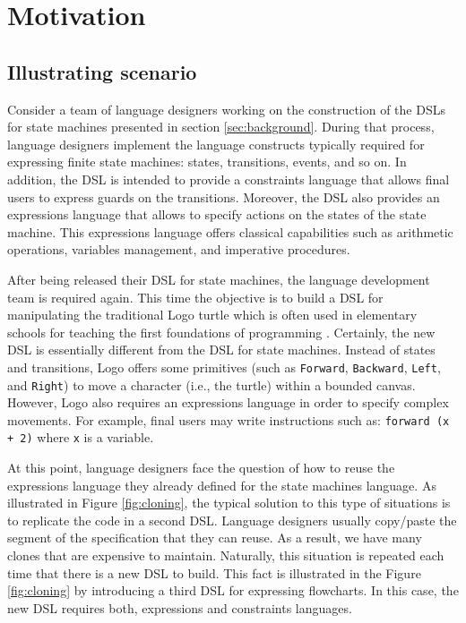 \section{Motivation}
\label{sec:motivation}

\subsection{Illustrating scenario}

Consider a team of language designers working on the construction of the DSLs for state machines presented in section \ref{sec:background}. During that process, language designers implement the language constructs typically required for expressing finite state machines: states, transitions, events, and so on. In addition, the DSL is intended to provide a constraints language that allows final users to express guards on the transitions. Moreover, the DSL also provides an expressions language that allows to specify actions on the states of the state machine. This expressions language offers classical capabilities such as arithmetic operations, variables management, and imperative procedures. 

After being released their DSL for state machines, the language development team is required again. This time the objective is to build a DSL for manipulating the traditional Logo turtle which is often used in elementary schools for teaching the first foundations of programming \cite{Olson:1987}. Certainly, the new DSL is essentially different from the DSL for state machines. Instead of states and transitions, Logo offers some primitives (such as \texttt{Forward}, \texttt{Backward}, \texttt{Left}, and \texttt{Right}) to move a character (i.e., the turtle) within a bounded canvas. However, Logo also requires an expressions language in order to specify complex movements. For example, final users may write instructions such as: \texttt{forward (x + 2)} where \texttt{x} is a variable.

At this point, language designers face the question of how to reuse the expressions language they already defined for the state machines language. As illustrated in Figure \ref{fig:cloning}, the typical solution to this type of situations is to replicate the code in a second DSL. Language designers usually copy/paste the segment of the specification that they can reuse. As a result, we have many clones that are expensive to maintain. Naturally, this situation is repeated each time that there is a new DSL to build. This fact is illustrated in the Figure \ref{fig:cloning} by introducing a third DSL for expressing flowcharts. In this case, the new DSL requires both, expressions and constraints languages. 

